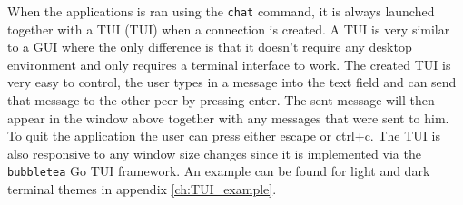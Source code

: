 When the applications is ran using the \texttt{chat} command, it is always launched together with a TUI (\acl{TUI}) when a connection is created. A TUI is very similar to a GUI where the only difference is that it doesn't require any desktop environment and only requires a terminal interface to work. The created TUI is very easy to control, the user types in a message into the text field and can send that message to the other peer by pressing enter. The sent message will then appear in the window above together with any messages that were sent to him. To quit the application the user can press either escape or ctrl+c. The TUI is also responsive to any window size changes since it is implemented via the \texttt{bubbletea} Go TUI framework.  An example can be found for light and dark terminal themes in appendix \ref{ch:TUI_example}.
